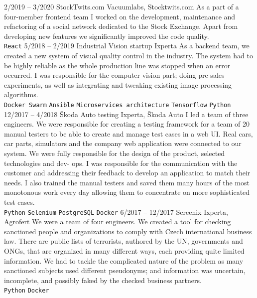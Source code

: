 \documentclass[10pt,A4]{article}
\begin{document}
\begin{entrylist}
		\entry
			{2/2019 -- 3/2020}
			{StockTwits.com}
			{Vacuumlabs, Stocktwits.com}
			{As a part of a four-member frontend team I worked on the development, maintenance
				and refactoring of a social network dedicated to the Stock Exchange. Apart from
				developing new features we significantly improved the code quality.  
				\\ 
				\texttt{React}}
		\entry
			{5/2018 -- 2/2019}
			{Industrial Vision startup}
			{Ixperta}
			{As a backend team, we created a new system of visual quality control in the
				industry. The system had to be highly reliable as the whole production line was stopped
				when an error occurred. I was responsible for the computer vision part; doing pre-sales
				experiments, as well as integrating and tweaking existing image processing algorithms.
				\\ 
				\texttt{Docker Swarm}\slashsep
				\texttt{Ansible}\slashsep
				\texttt{Microservices architecture}\slashsep
				\texttt{Tensorflow}\slashsep
				\texttt{Python}}
		\entry
			{12/2017 -- 4/2018}
			{Škoda Auto testing}
			{Ixperta, Škoda Auto}
			{I led a team of three engineers. We were responsible for creating a testing
				framework for a team of 20 manual testers to be able to create and manage test cases
				in a web UI. Real cars, car parts, simulators and the company web application were
				connected to our system.
				We were fully responsible for the design of the product, selected technologies and dev-
				ops. I was responsible for the communication with the customer and addressing their
				feedback to develop an application to match their needs. I also trained the manual
				testers and saved them many hours of the most monotonous work every day
				allowing them to concentrate on more sophisticated test cases. 
				\\ 
				\texttt{Python}\slashsep
				\texttt{Selenium}\slashsep
				\texttt{PostgreSQL}\slashsep
				\texttt{Docker}
			}
		\entry
			{6/2017 -- 12/2017}
			{Screenix}
			{Ixperta, Agrofert}
			{We were a team of four engineers. We created a tool for checking sanctioned people
				and organizations to comply with Czech international business law. There are public
				lists of terrorists, authored by the UN, governments and ONGs, that are organized in
				many different ways, each providing quite limited information. We had to tackle the
				complicated nature of the problem as many sanctioned subjects used different pseudonyms;
				and information was uncertain, incomplete, and possibly faked by the checked
				business partners.
				\\ 
				\texttt{Python}\slashsep
				\texttt{Docker}
			}
	\end{entrylist}
	
	
	
	\vfill
\end{document}
